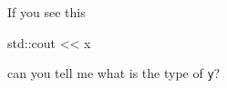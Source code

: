 If you see this

\begin{consolethree}[escapeinside=||]

std::cout << x %

\end{consolethree}



can you tell me what is the type of \texttt{y}?

